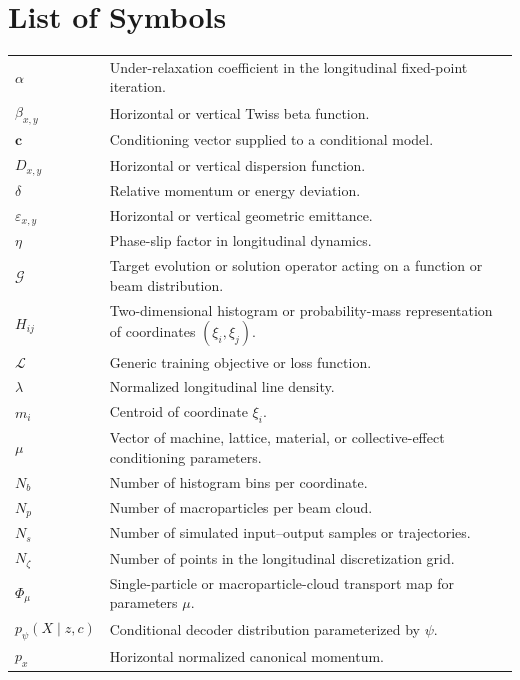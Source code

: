 \chapter*{List of Symbols}
\begingroup
\setlength{\LTleft}{0.1786\textwidth}
\setlength{\LTright}{0pt}
\begin{longtable}{@{}p{}@{}p{}@{}}
\(\alpha\) & Under-relaxation coefficient in the longitudinal fixed-point iteration.\\
\(\beta_{x,y}\) & Horizontal or vertical Twiss beta function.\\
\(\mathbf c\) & Conditioning vector supplied to a conditional model.\\
\(D_{x,y}\) & Horizontal or vertical dispersion function.\\
\(\delta\) & Relative momentum or energy deviation.\\
\(\varepsilon_{x,y}\) & Horizontal or vertical geometric emittance.\\
\(\eta\) & Phase-slip factor in longitudinal dynamics.\\
\(\mathcal G\) & Target evolution or solution operator acting on a function or beam distribution.\\
\(H_{ij}\) & Two-dimensional histogram or probability-mass representation of coordinates \(( \xi_{i} , \xi_{j} ) .\)\\
\(\mathcal L\) & Generic training objective or loss function.\\
\(\lambda\) & Normalized longitudinal line density.\\
\(m_i\) & Centroid of coordinate \(\xi_{i} .\)\\
\(\mu\) & Vector of machine, lattice, material, or collective-effect conditioning parameters.\\
\(N_b\) & Number of histogram bins per coordinate.\\
\(N_p\) & Number of macroparticles per beam cloud.\\
\(N_s\) & Number of simulated input–output samples or trajectories.\\
\(N_\zeta\) & Number of points in the longitudinal discretization grid.\\
\(\Phi_\mu\) & Single-particle or macroparticle-cloud transport map for parameters \(\mu .\)\\
\(p_\psi(X\mid z,c)\) & Conditional decoder distribution parameterized by \(\psi .\)\\
\(p_x\) & Horizontal normalized canonical momentum.\\

\end{longtable}
